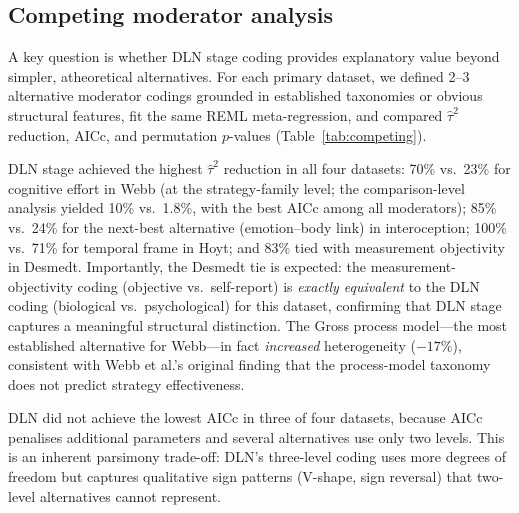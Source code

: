 \documentclass[11pt]{article}
\begin{document}
\subsection{Competing moderator analysis}

A key question is whether DLN stage coding provides explanatory value
beyond simpler, atheoretical alternatives. For each primary dataset,
we defined 2--3 alternative moderator codings grounded in established
taxonomies or obvious structural features, fit the same REML
meta-regression, and compared $\hat\tau^2$ reduction, AICc, and
permutation $p$-values (Table~\ref{tab:competing}).

DLN stage achieved the highest $\hat\tau^2$ reduction in all four
datasets: 70\% vs.\ 23\% for cognitive effort in Webb (at the
strategy-family level; the comparison-level analysis yielded 10\% vs.\
1.8\%, with the best AICc among all moderators); 85\% vs.\ 24\%
for the next-best alternative (emotion--body link) in interoception;
100\% vs.\ 71\% for temporal frame in Hoyt; and 83\% tied with
measurement objectivity in Desmedt. Importantly, the Desmedt tie
is expected: the measurement-objectivity coding (objective vs.\
self-report) is \textit{exactly equivalent} to the DLN coding
(biological vs.\ psychological) for this dataset, confirming that
DLN stage captures a meaningful structural distinction. The Gross
process model---the most established alternative for Webb---in fact
\textit{increased} heterogeneity ($-17\%$), consistent with Webb et
al.'s\cite{Webb2012} original finding that the process-model
taxonomy does not predict strategy effectiveness.

DLN did not achieve the lowest AICc in three of four datasets, because
AICc penalises additional parameters and several alternatives use only
two levels. This is an inherent parsimony trade-off: DLN's three-level
coding uses more degrees of freedom but captures qualitative sign
patterns (V-shape, sign reversal) that two-level alternatives cannot
represent.
\end{document}
